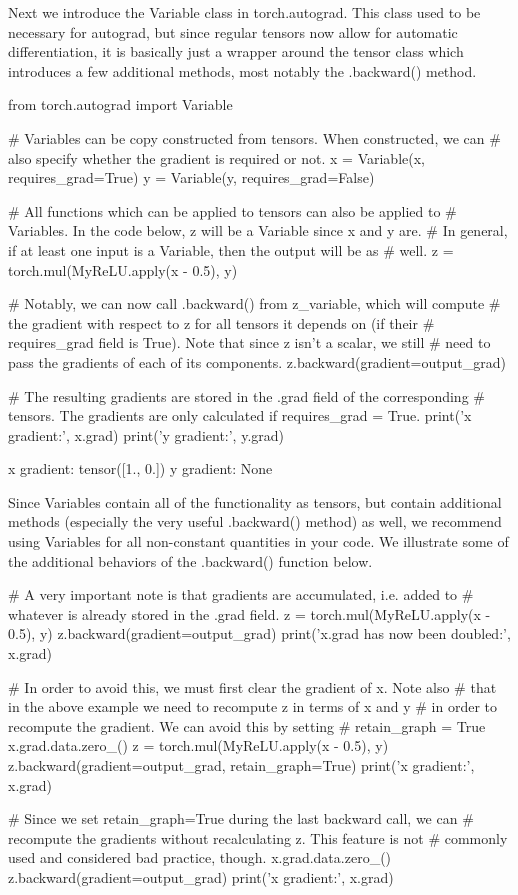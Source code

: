 Next we introduce the Variable class in torch.autograd. This class used to be necessary for autograd, but since regular tensors now allow for automatic differentiation, it is basically just a wrapper around the tensor class which introduces a few additional methods, most notably the .backward() method.
\begin{python}
from torch.autograd import Variable

# Variables can be copy constructed from tensors. When constructed, we can 
# also specify whether the gradient is required or not.
x = Variable(x, requires_grad=True)
y = Variable(y, requires_grad=False)

# All functions which can be applied to tensors can also be applied to 
# Variables. In the code below, z will be a Variable since x and y are.
# In general, if at least one input is a Variable, then the output will be as
# well.
z = torch.mul(MyReLU.apply(x - 0.5), y)

# Notably, we can now call .backward() from z_variable, which will compute 
# the gradient with respect to z for all tensors it depends on (if their
# requires_grad field is True). Note that since z isn't a scalar, we still
# need to pass the gradients of each of its components.
z.backward(gradient=output_grad)

# The resulting gradients are stored in the .grad field of the corresponding
# tensors. The gradients are only calculated if requires_grad = True.
print('x gradient:', x.grad)
print('y gradient:', y.grad)
\end{python}
\begin{python}
x gradient: tensor([1., 0.])
y gradient: None
\end{python}
Since Variables contain all of the functionality as tensors, but contain additional methods (especially the very useful .backward() method) as well, we recommend using Variables for all non-constant quantities in your code. We illustrate some of the additional behaviors of the .backward() function below.
\begin{python}
# A very important note is that gradients are accumulated, i.e. added to
# whatever is already stored in the .grad field.
z = torch.mul(MyReLU.apply(x - 0.5), y)
z.backward(gradient=output_grad)
print('x.grad has now been doubled:', x.grad)

# In order to avoid this, we must first clear the gradient of x. Note also
# that in the above example we need to recompute z in terms of x and y 
# in order to recompute the gradient. We can avoid this by setting 
# retain_graph = True
x.grad.data.zero_()
z = torch.mul(MyReLU.apply(x - 0.5), y)
z.backward(gradient=output_grad, retain_graph=True)
print('x gradient:', x.grad)

# Since we set retain_graph=True during the last backward call, we can 
# recompute the gradients without recalculating z. This feature is not
# commonly used and considered bad practice, though.
x.grad.data.zero_()
z.backward(gradient=output_grad)
print('x gradient:', x.grad)
\end{python}
